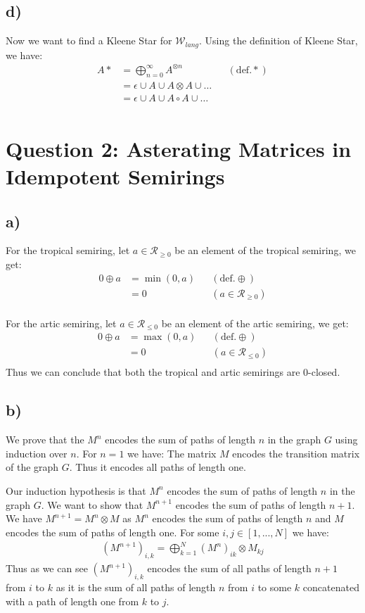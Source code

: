 \documentclass[a4paper,12pt]{ETHexercise}
\begin{document}
\subsection*{d)}

Now we want to find a Kleene Star for $\mathcal{W}_{lang}$. Using the definition of Kleene Star, we have:
\begin{align}
    A* &= \bigoplus^{\infty}_{n=0}A^{\otimes n} &&(\text{def.} *)\\
     &= \epsilon \cup A \cup A \otimes A \cup \dots\\ 
     &= \epsilon \cup A \cup A \circ A \cup \dots\\ 
\end{align}

\section*{Question 2: Asterating Matrices in Idempotent Semirings}
\subsection*{a)}
For the tropical semiring, let $a \in \mathcal{R}_{\geq 0}$ be an element of the tropical semiring, we get:
\begin{align}
    0 \oplus a &= \min(0, a) &&(\text{def.} \oplus)\\
    &= 0 &&(a \in \mathcal{R}_{\geq 0})\\
\end{align}

For the artic semiring, let $a \in \mathcal{R}_{\leq 0}$ be an element of the artic semiring, we get:
\begin{align}
    0 \oplus a &= \max(0, a) &&(\text{def.} \oplus)\\
    &= 0 &&(a \in \mathcal{R}_{\leq 0})\\
\end{align}
Thus we can conclude that both the tropical and artic semirings are 0-closed.

\subsection*{b)}
We prove that the $M^n$ encodes the sum of paths of length $n$ in the graph $G$ using induction over $n$.
For $n = 1$ we have:
The matrix $M$ encodes the transition matrix of the graph $G$. Thus it encodes all paths of length one.

Our induction hypothesis is that $M^n$ encodes the sum of paths of length $n$ in the graph $G$. We want to show that $M^{n+1}$ encodes the sum of paths of length $n+1$.
We have $M^{n+1} = M^{n} \otimes M$ as $M^{n}$ encodes the sum of paths of length $n$ and $M$ encodes the sum of paths of length one.
For some $i, j \in [1,...,N]$ we have:
\begin{align}
    (M^{n+1})_{i,k} = \bigoplus_{k=1}^{N} (M^n)_{ik} \otimes M_{kj}
\end{align}
Thus as we can see $(M^{n+1})_{i,k}$ encodes the sum of all paths of length $n+1$ from $i$ to $k$ as
it is the sum of all paths of length $n$ from $i$ to some $k$ concatenated with a path of length one from $k$ to $j$.
\end{document}
